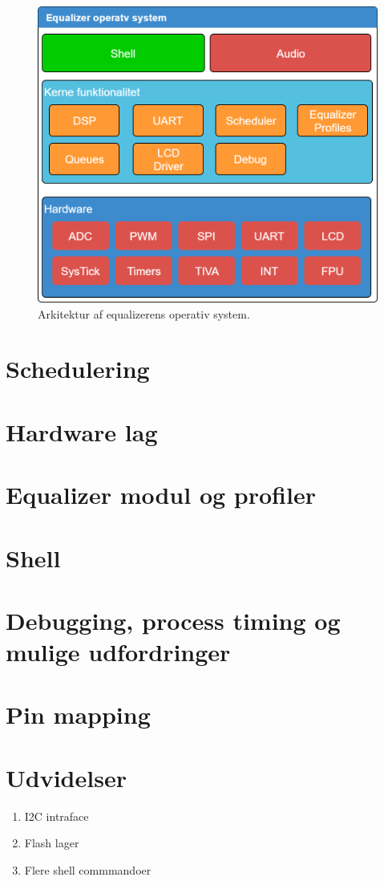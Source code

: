 \begin{figure}[h!]
	\centering
	\includegraphics[width=.8\textwidth]{billeder/eq_os.png}
	\caption{Arkitektur af equalizerens operativ system.}
	\label{fig:eq_os}
\end{figure}
\FloatBlock


\section{Schedulering}




\section{Hardware lag}


\section{Equalizer modul og profiler}

\section{Shell}

\section{Debugging, process timing og mulige udfordringer}

\section{Pin mapping}


\section{Udvidelser}

\begin{enumerate}
	\item I2C intraface
	\item Flash lager
	\item Flere shell commmandoer
\end{enumerate}
